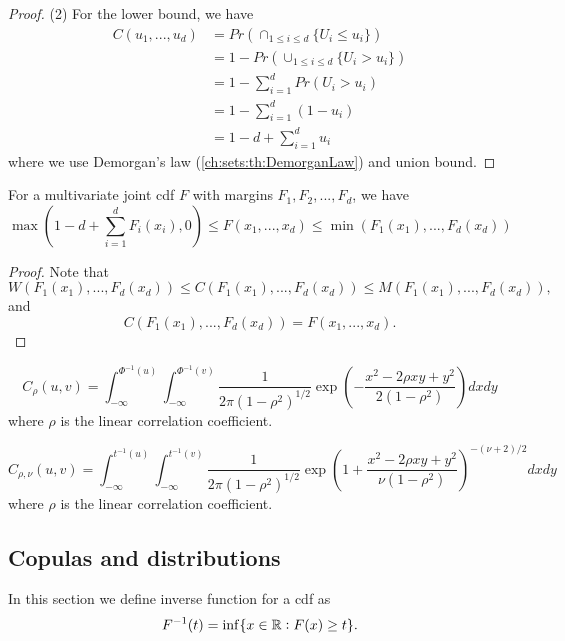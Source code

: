 \begin{refsection}
\begin{proof}
(2) For the lower bound, we have
\begin{align*}
C(u_1,...,u_d) &= Pr(\cap_{1\leq i\leq d}\{U_i\leq u_i\}) \\
&= 1 - Pr(\cup_{1\leq i\leq d}\{U_i > u_i\})\\
&= 1 - \sum_{i=1}^d Pr(U_i > u_i) \\
&=1 -  \sum_{i=1}^d(1 - u_i) \\
&=1 - d + \sum_{i=1}^du_i 
\end{align*}
where we use Demorgan's law (\autoref{ch:sets:th:DemorganLaw}) and union bound.
\end{proof}


\begin{corollary}
For a multivariate joint cdf $F$ with margins $F_1,F_2,...,F_d$, we have
$$\max(1 - d + \sum_{i=1}^d F_i(x_i),0) \leq F(x_1,...,x_d) \leq \min(F_1(x_1),...,F_d(x_d))$$	
\end{corollary}
\begin{proof}
Note that
$$W(F_1(x_1),...,F_d(x_d))\leq C(F_1(x_1),...,F_d(x_d)) \leq M(F_1(x_1),...,F_d(x_d)),$$
and 
$$C(F_1(x_1),...,F_d(x_d)) = F(x_1,...,x_d).$$	
\end{proof}

\begin{example}
$$C_{\rho}(u,v) = \int_{-\infty}^{\Phi^{-1}(u)}\int_{-\infty}^{\Phi^{-1}(v)}\frac{1}{2\pi(1-\rho^2)^{1/2}}\exp(-\frac{x^2-2\rho x y + y^2}{2(1-\rho^2)}) dxdy$$
where $\rho$ is the linear correlation coefficient.
\end{example}



\begin{example}
	$$C_{\rho,\nu}(u,v) = \int_{-\infty}^{t^{-1}(u)}\int_{-\infty}^{t^{-1}(v)}\frac{1}{2\pi(1-\rho^2)^{1/2}}\exp(1 + \frac{x^2-2\rho x y + y^2}{\nu (1-\rho^2)})^{-(\nu+2)/2} dxdy$$
	where $\rho$ is the linear correlation coefficient.
\end{example}






\subsection{Copulas and distributions}

\begin{note}
In this section we define inverse function for a cdf as
$$F^{-1}(t) = \inf\{x\in\mathbb{R}: F(x)\geq t\}.$$	
\end{note}



\end{refsection}

